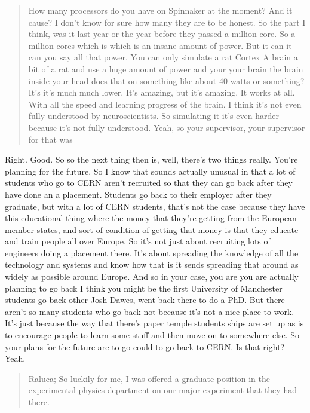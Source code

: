 \documentclass[
]{book}
\begin{document}
\begin{quote}
How many processors do you have on Spinnaker at the moment? And it cause? I don't know for sure how many they are to be honest. So the part I think, was it last year or the year before they passed a million core. So a million cores which is which is an insane amount of power. But it can it can you say all that power. You can only simulate a rat Cortex A brain a bit of a rat and use a huge amount of power and your your brain the brain inside your head does that on something like about 40 watts or something? It's it's much much lower. It's amazing, but it's amazing. It works at all. With all the speed and learning progress of the brain. I think it's not even fully understood by neuroscientists. So simulating it it's even harder because it's not fully understood. Yeah, so your supervisor, your supervisor for that was
\end{quote}

Right. Good. So so the next thing then is, well, there's two things really. You're planning for the future. So I know that sounds actually unusual in that a lot of students who go to CERN aren't recruited so that they can go back after they have done an a placement. Students go back to their employer after they graduate, but with a lot of CERN students, that's not the case because they have this educational thing where the money that they're getting from the European member states, and sort of condition of getting that money is that they educate and train people all over Europe. So it's not just about recruiting lots of engineers doing a placement there. It's about spreading the knowledge of all the technology and systems and know how that is it sends spreading that around as widely as possible around Europe. And so in your case, you are you are actually planning to go back I think you might be the first University of Manchester students go back other \href{https://joshhdawes.github.io/}{Josh Dawes}, went back there to do a PhD. But there aren't so many students who go back not because it's not a nice place to work. It's just because the way that there's paper temple students ships are set up as is to encourage people to learn some stuff and then move on to somewhere else. So your plans for the future are to go could to go back to CERN. Is that right? Yeah.

\begin{quote}
Raluca; So luckily for me, I was offered a graduate position in the experimental physics department on our major experiment that they had there.
\end{quote}
\end{document}
